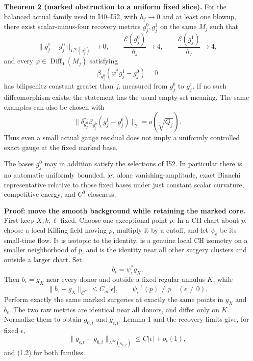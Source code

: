 \documentclass[
  11pt,
]{article}
\begin{document}
\textbf{Theorem 2 (marked obstruction to a uniform fixed slice).} For
the balanced actual family used in I40--I52, with \(h_j\to0\) and at
least one blowup, there exist scalar-minus-four recovery metrics
\(g_j^0,g_j^1\) on the same \(M_j\) such that \[
 \|g_j^1-g_j^0\|_{L^\infty(g_j^0)}\longrightarrow0,\qquad
 \frac{\mathcal E(g_j^0)}{h_j}\longrightarrow4,\qquad
 \frac{\mathcal E(g_j^1)}{h_j}\longrightarrow4,                 \tag{3.2}
\] and every \(\varphi\in\operatorname{Diff}_0(M_j)\) satisfying \[
 \beta_{g_j^0}(\varphi^*g_j^1-g_j^0)=0                         \tag{3.3}
\] has bilipschitz constant greater than \(j\), measured from \(g_j^0\)
to \(g_j^1\). If no such diffeomorphism exists, the statement has the
usual empty-set meaning. The same examples can also be chosen with \[
 \|\delta_{g_j^0}^*\beta_{g_j^0}(g_j^1-g_j^0)\|_2=o(\sqrt{Q_j}).
                                                               \tag{3.3a}
\] Thus even a small actual gauge residual does not imply a uniformly
controlled exact gauge at the fixed marked base.

The bases \(g_j^0\) may in addition satisfy the selections of I52. In
particular there is no automatic uniformly bounded, let alone
vanishing-amplitude, exact Bianchi representative relative to those
fixed bases under just constant scalar curvature, competitive energy,
and \(C^0\) closeness.

\textbf{Proof: move the smooth background while retaining the marked
core.} First keep \(X,k,\ell\) fixed. Choose one exceptional point
\(p\). In a CH chart about \(p\), choose a local Killing field moving
\(p\), multiply it by a cutoff, and let \(\psi_\epsilon\) be its
small-time flow. It is isotopic to the identity, is a genuine local CH
isometry on a smaller neighborhood of \(p\), and is the identity near
all other surgery clusters and outside a larger chart. Set \[
 b_\epsilon=\psi_\epsilon^*g_X .
\] Then \(b_\epsilon=g_X\) near every donor and outside a fixed regular
annulus \(K\), while \[
 \|b_\epsilon-g_X\|_{C^m}\le C_m|\epsilon|,\qquad
 \psi_\epsilon^{-1}(p)\ne p\quad(\epsilon\ne0).                 \tag{3.4}
\] Perform exactly the same marked surgeries at exactly the same points
in \(g_X\) and \(b_\epsilon\). The two raw metrics are identical near
all donors, and differ only on \(K\). Normalize them to obtain
\(g_{0,t}\) and \(g_{\epsilon,t}\). Lemma 1 and the recovery limits
give, for fixed \(\epsilon\), \[
 \|g_{\epsilon,t}-g_{0,t}\|_{L^\infty(g_{0,t})}
       \le C|\epsilon|+o_t(1),                               \tag{3.5}
\] and (1.2) for both families.
\end{document}
